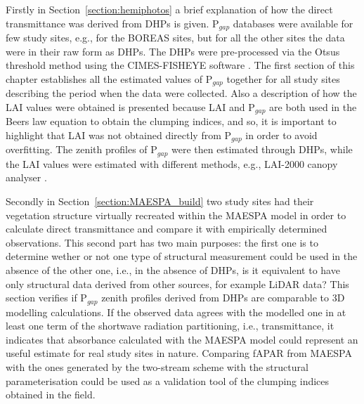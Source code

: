 \documentclass[a4paper,11pt]{report}
\begin{document}
Firstly in Section~\ref{section:hemiphotos} a brief explanation of how the direct transmittance was derived from DHPs is given. P$_{gap}$ databases were available for few study sites, e.g., for the BOREAS sites, but for all the other sites the data were in their raw form as DHPs. The DHPs were pre-processed via the Otsu\textquotesingle s threshold method \citep{Otsu1979} using the CIMES-FISHEYE software \citep{Walter2012}. The first section of this chapter establishes all the estimated values of P$_{gap}$ together for all study sites describing the period when the data were collected. Also a description of how the LAI values were obtained is presented because LAI and P$_{gap}$ are both used in the Beer\textquotesingle s law equation to obtain the clumping indices, and so, it is important to highlight that LAI was not obtained directly from P$_{gap}$ in order to avoid overfitting. The zenith profiles of P$_{gap}$ were then estimated through DHPs, while the LAI values were estimated with different methods, e.g., LAI-2000 canopy analyser \citep{LI-COR1992}.

Secondly in Section~\ref{section:MAESPA_build} two study sites had their vegetation structure virtually recreated within the MAESPA model in order to calculate direct transmittance and compare it with empirically determined observations. This second part has two main purposes: the first one is to determine wether or not one type of structural measurement could be used in the absence of the other one, i.e., in the absence of DHPs, is it equivalent to have only structural data derived from other sources, for example LiDAR data? This section verifies if P$_{gap}$ zenith profiles derived from DHPs are comparable to 3D modelling calculations. If the observed data agrees with the modelled one in at least one term of the shortwave radiation partitioning, i.e., transmittance, it indicates that absorbance calculated with the MAESPA model could represent an useful estimate for real study sites in nature. Comparing fAPAR from MAESPA with the ones generated by the two-stream scheme with the structural parameterisation could be used as a validation tool of the clumping indices obtained in the field.
\end{document}
